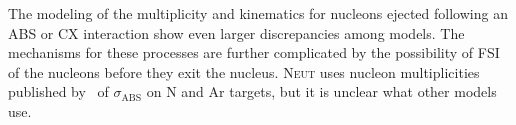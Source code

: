 The modeling of the multiplicity and kinematics for nucleons ejected following an ABS or CX interaction show even larger discrepancies among models. The mechanisms for these processes are further complicated by the possibility of FSI of the nucleons before they exit the nucleus. 
\textsc{Neut} uses nucleon multiplicities published by~\cite{Rowntree} of $\sigma_{\mathrm{ABS}}$ on N and Ar targets, but it is unclear what other models use.
